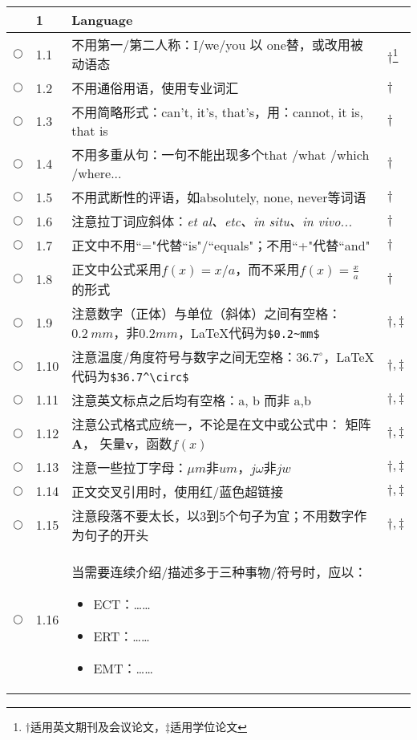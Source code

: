 \documentclass{ctexart}
\begin{document}
\begin{center}
\begin{longtable}{|l|l|p{}|l|}
 & 1 & \textcolor[rgb]{0.00,0.00,1.00}{\textbf{Language}}& \\\hline
$\bigcirc$& 1.1 & 不用第一/第二人称：I/we/you 以 one替，或改用被动语态 & $\dagger$\footnote{$\dagger$适用英文期刊及会议论文，$\ddagger$适用学位论文}\\\hline
$\bigcirc$& 1.2 & 不用通俗用语，使用专业词汇& $\dagger$\\\hline
$\bigcirc$& 1.3 & 不用简略形式：can't, it's, that's，用：cannot, it is, that is & $\dagger$\\\hline
$\bigcirc$& 1.4 & 不用多重从句：一句不能出现多个that /what /which /where...& $\dagger$\\\hline
$\bigcirc$& 1.5 & 不用武断性的评语，如absolutely, none, never等词语 & $\dagger$\\\hline
$\bigcirc$& 1.6 & 注意拉丁词应斜体：\it{et al、etc、in situ、in vivo}...& $\dagger$\\\hline
$\bigcirc$& 1.7 & 正文中不用``="代替``is"/``equals"；不用``+"代替``and"& $\dagger$\\\hline
$\bigcirc$& 1.8 & 正文中公式采用$f(x)=x/a$，而不采用$f(x)=\frac{x}{a}$ 的形式& $\dagger$\\\hline
$\bigcirc$& 1.9 & 注意数字（正体）与单位（斜体）之间有空格：$0.2~mm$，非$0.2mm$，\LaTeX 代码为\verb+$0.2~mm$+& $\dagger, \ddagger$\\\hline
$\bigcirc$& 1.10 & 注意温度/角度符号与数字之间无空格：$36.7^\circ$，\LaTeX 代码为\verb+$36.7^\circ$+ & $\dagger, \ddagger$\\\hline
$\bigcirc$& 1.11 & 注意英文标点之后均有空格：a, b 而非  a,b & $\dagger, \ddagger$\\\hline
$\bigcirc$& 1.12 & 注意公式格式应统一，不论是在文中或公式中： 矩阵 $\mathbf{A}$， 矢量$\mathbf{v}$，函数$f(x)$& $\dagger, \ddagger$\\\hline
$\bigcirc$& 1.13 & 注意一些拉丁字母：$\mu m$非$um$，$j\omega$非$jw$ & $\dagger, \ddagger$\\\hline
$\bigcirc$& 1.14 & 正文交叉引用时，使用红/蓝色超链接 & $\dagger, \ddagger$\\\hline%
$\bigcirc$& 1.15 & 注意段落不要太长，以3到5个句子为宜；不用数字作为句子的开头 & $\dagger, \ddagger$\\\hline
$\bigcirc$& 1.16 & 当需要连续介绍/描述多于三种事物/符号时，应以： 
\begin{itemize}
  \item ECT：……
  \item ERT：……
  \item EMT：……

\end{itemize}
\end{longtable}
\end{center}
\end{document}
